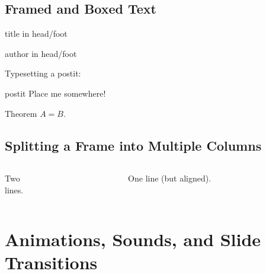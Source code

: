 \documentclass{beamer}
\begin{document}
\subsection{Framed and Boxed Text}
\begin{frame}
  \begin{beamercolorbox}[ht=2.5ex,dp=1ex,center]{title in head/foot}
    \insertshorttitle
  \end{beamercolorbox}%
  \begin{beamercolorbox}[ht=2.5ex,dp=1ex,center]{author in head/foot}
    \insertshortauthor
  \end{beamercolorbox}
  \mbox{}\medskip\newline
  Typesetting a postit:\newline
  \begin{beamercolorbox}[sep=1em,wd=5cm]{postit}
    Place me somewhere!
  \end{beamercolorbox}
  \mbox{}\medskip\newline
  \begin{beamerboxesrounded}[upper=block head,lower=block body,shadow=true]{Theorem}
    $A = B$.
  \end{beamerboxesrounded}
\end{frame}
\subsection{Splitting a Frame into Multiple Columns}
\begin{frame}
  \begin{columns}[t]
    \begin{column}{5cm}
      Two\\lines.
    \end{column}
    \begin{column}{5cm}
      One line (but aligned).
    \end{column}
  \end{columns}
\end{frame}
\section{Animations, Sounds, and Slide Transitions}
\end{document}
